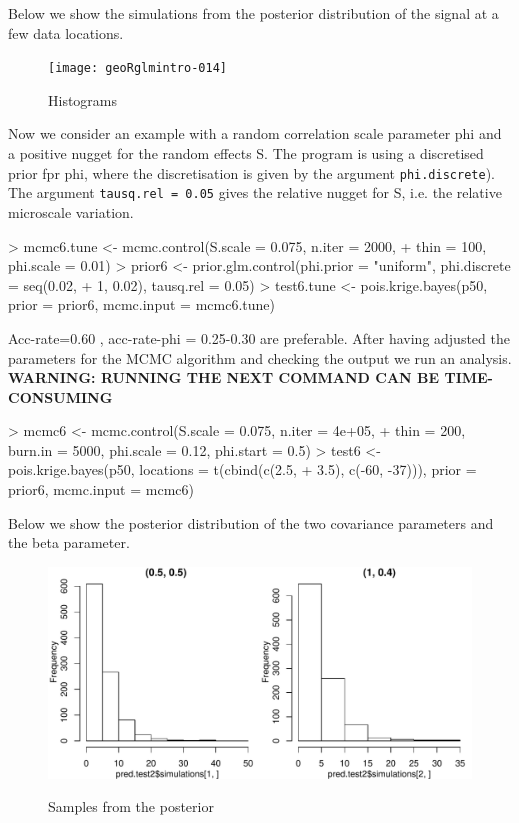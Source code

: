 \documentclass[12pt,a4paper]{article}
\newcommand{\strong}[1]{{\textbf{ #1}}}
\newcommand{\code}[1]{\texttt{\small #1}}
\begin{document}
Below we show the simulations from the posterior distribution of the signal at a few data locations.
\begin{figure}[h!]
\centering
\texttt{[image: geoRglmintro-014]}
\label{fig:hist.sim.bayes}
\caption{Histograms}
\end{figure}

Now we consider an example with a random correlation scale parameter phi and a positive nugget for the random effects S. The program is using a discretised prior fpr phi, where the discretisation is given by
the argument \code{phi.discrete}). The argument \code{tausq.rel = 0.05} gives the relative nugget for S, i.e. the relative 
microscale variation.
\begin{Schunk}
\begin{Sinput}
> mcmc6.tune <- mcmc.control(S.scale = 0.075, n.iter = 2000, 
+     thin = 100, phi.scale = 0.01)
> prior6 <- prior.glm.control(phi.prior = "uniform", phi.discrete = seq(0.02, 
+     1, 0.02), tausq.rel = 0.05)
> test6.tune <- pois.krige.bayes(p50, prior = prior6, mcmc.input = mcmc6.tune)
\end{Sinput}
\end{Schunk}

Acc-rate=0.60 , acc-rate-phi = 0.25-0.30  are preferable. 
After having adjusted the parameters for the MCMC algorithm and checking the output we run an analysis.\\
\strong{WARNING: RUNNING THE NEXT COMMAND CAN BE TIME-CONSUMING}
\begin{Schunk}
\begin{Sinput}
> mcmc6 <- mcmc.control(S.scale = 0.075, n.iter = 4e+05, 
+     thin = 200, burn.in = 5000, phi.scale = 0.12, phi.start = 0.5)
> test6 <- pois.krige.bayes(p50, locations = t(cbind(c(2.5, 
+     3.5), c(-60, -37))), prior = prior6, mcmc.input = mcmc6)
\end{Sinput}
\end{Schunk}

Below we show the posterior distribution of the two covariance parameters and the beta parameter.
\begin{figure}[h!]
\centering
\includegraphics{geoRglmintro-017}
\label{fig:posterior}
\caption{Samples from the posterior}
\end{figure}
\end{document}
